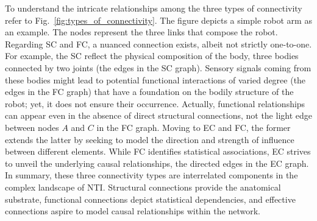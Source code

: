 To understand the intricate relationships among the three types of connectivity refer to Fig.~\ref{fig:types_of_connectivity}. The figure depicts a simple robot arm as an example. The nodes represent the three links that compose the robot. Regarding SC and FC, a nuanced connection exists, albeit not strictly one-to-one. For example, the SC reflect the physical composition of the body, three bodies connected by two joints (the edges in the SC graph). Sensory signals coming from these bodies might lead to potential functional interactions of varied degree (the edges in the FC graph) that have a foundation on the bodily structure of the robot; yet, it does not ensure their occurrence. Actually, functional relationships can appear even in the absence of direct structural connections, not the light edge between nodes $A$ and $C$ in the FC graph. Moving to EC and FC, the former extends the latter by seeking to model the direction and strength of influence between different elements. While FC identifies statistical associations, EC strives to unveil the underlying causal relationships, the directed edges in the EC graph. In summary, these three connectivity types are interrelated components in the complex landscape of NTI. Structural connections provide the anatomical substrate, functional connections depict statistical dependencies, and effective connections aspire to model causal relationships within the network.


